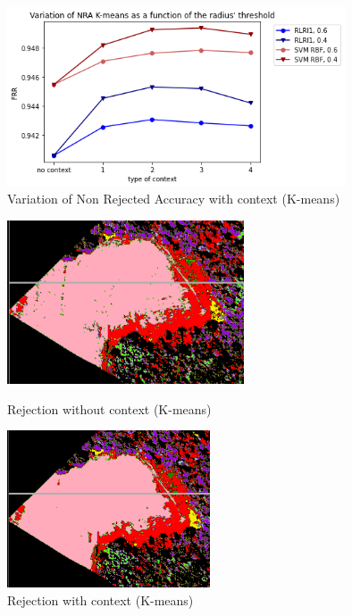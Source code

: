 \documentclass{siamart171218}
\begin{document}
\begin{figure}[H]
    \centering
    \includegraphics[width=10cm]{images/NRA_Kmeans_context.png}
    \caption{Variation of Non Rejected Accuracy with context (K-means)}
    \label{NRA_Kmeans_context}
\end{figure}

\begin{figure}[h]
    \begin{minipage}[c]{.46\linewidth}
        \centering
        \includegraphics[width=7cm]{images/field_without_context.png}
        \caption{Rejection without context (K-means)}
        \label{without_context_Kmeans}
    \end{minipage}
    \hfill
    \begin{minipage}[c]{.46\linewidth}
        \centering
        \includegraphics[width=6cm]{images/field_with_context.png}
        \caption{Rejection with context (K-means)}
        \label{with_context_Kmeans}
    \end{minipage}
    \hfill
\end{figure}
\end{document}
